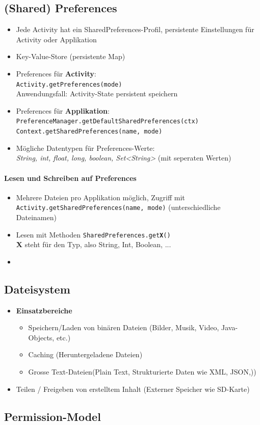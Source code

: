 \documentclass[a4paper]{article}
\begin{document}
\subsection{(Shared) Preferences}
\begin{itemize}
	\item Jede Activity hat ein SharedPreferences-Profil, persistente Einstellungen für Activity oder Applikation
	\item Key-Value-Store (persistente Map)
	\item Preferences für \textbf{Activity}: \\
	\texttt{Activity.getPreferences(mode)}\\
	Anwendungsfall: Activity-State persistent speichern
	\item Preferences für \textbf{Applikation}: \\
	\texttt{PreferenceManager.getDefaultSharedPreferences(ctx)}\\
	\texttt{Context.getSharedPreferences(name, mode)}
	\item Mögliche Datentypen für Preferences-Werte:\\
	\textit{String, int, float, long, boolean, Set<String>} (mit seperaten Werten)
\end{itemize}
\paragraph{Lesen und Schreiben auf Preferences}
\begin{itemize}
	\item Mehrere Dateien pro Applikation möglich, Zugriff mit\\
		\texttt{Activity.getSharedPreferences(name, mode)} (unterschiedliche Dateinamen)
	\item Lesen mit Methoden \texttt{SharedPreferences.get\textbf{X}()}\\
		\textbf{X} steht für den Typ, also String, Int, Boolean, ...
	\item 
\end{itemize}

	
\subsection{Dateisystem}

\begin{itemize}
	\item \textbf{Einsatzbereiche}
		\begin{itemize}
			\item Speichern/Laden von binären Dateien (Bilder, Musik, Video, Java-Objects, etc.)
			\item Caching (Heruntergeladene Dateien)
			\item Grosse Text-Dateien(Plain Text, Strukturierte Daten wie XML, JSON,))
		\end{itemize}
	\item Teilen / Freigeben von erstelltem Inhalt (Externer Speicher wie SD-Karte)
\end{itemize}


	
\subsection{Permission-Model}
\end{document}
